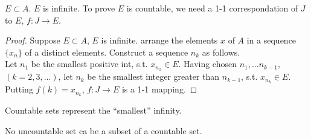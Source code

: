 $E\subset A$. $E$ is infinite.
To prove $E$ is countable, we need a 1-1 correspondation of $J$ to $E$, $f:J\rightarrow E$.

\begin{proof}
    Suppose $E\subset A$, $E$ is infinite.
    arrange the elements $x$ of $A$ in a sequence $\{x_n\}$ of a distinct elements. Construct a sequence $n_k$ as follows.\\
    Let $n_1$ be the smallest positive int, s.t. $x_{n_1}\in E$.
    Having chosen $n_1,...n_{k-1}$,$(k=2,3,...)$, let $n_k$ be the smallest integer greater than $n_{k-1}$, s.t. $x_{n_k} \in E$.\\
    Putting $f(k) = x_{n_k}$, $f:J\rightarrow E$ is a 1-1 mapping.
\end{proof}

Countable sets represent the ``smallest'' infinity.

No uncountable set ca be a subset of a countable set.


